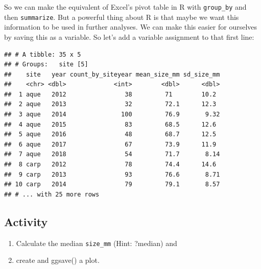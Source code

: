 \documentclass[]{book}
\newenvironment{Shaded}{\begin{snugshade}}{\end{snugshade}}
\newcommand{\DataTypeTok}[1]{\textcolor[rgb]{0.13,0.29,0.53}{#1}}
\newcommand{\KeywordTok}[1]{\textcolor[rgb]{0.13,0.29,0.53}{\textbf{#1}}}
\newcommand{\NormalTok}[1]{#1}
\newcommand{\OperatorTok}[1]{\textcolor[rgb]{0.81,0.36,0.00}{\textbf{#1}}}
\newcommand{\OtherTok}[1]{\textcolor[rgb]{0.56,0.35,0.01}{#1}}
\newcommand{\StringTok}[1]{\textcolor[rgb]{0.31,0.60,0.02}{#1}}
\providecommand{\tightlist}{%
  \setlength{\itemsep}{0pt}\setlength{\parskip}{0pt}}
\begin{document}
So we can make the equivalent of Excel's pivot table in R with \texttt{group\_by} and then \texttt{summarize}. But a powerful thing about R is that maybe we want this information to be used in further analyses. We can make this easier for ourselves by saving this as a variable. So let's add a variable assignment to that first line:

\begin{Shaded}
\end{Shaded}

\begin{verbatim}
## # A tibble: 35 x 5
## # Groups:   site [5]
##    site   year count_by_siteyear mean_size_mm sd_size_mm
##    <chr> <dbl>             <int>        <dbl>      <dbl>
##  1 aque   2012                38         71        10.2 
##  2 aque   2013                32         72.1      12.3 
##  3 aque   2014               100         76.9       9.32
##  4 aque   2015                83         68.5      12.6 
##  5 aque   2016                48         68.7      12.5 
##  6 aque   2017                67         73.9      11.9 
##  7 aque   2018                54         71.7       8.14
##  8 carp   2012                78         74.4      14.6 
##  9 carp   2013                93         76.6       8.71
## 10 carp   2014                79         79.1       8.57
## # ... with 25 more rows
\end{verbatim}

\hypertarget{activity-2}{%
\subsection{Activity}\label{activity-2}}

\begin{enumerate}
\def\labelenumi{\arabic{enumi}.}
\tightlist
\item
  Calculate the median \texttt{size\_mm} (Hint: ?median) and
\item
  create and ggsave() a plot.
\end{enumerate}
\end{document}
